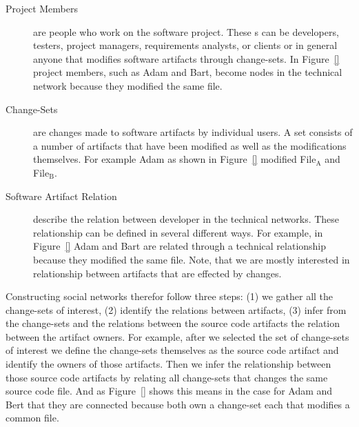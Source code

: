 \begin{description}
\item[Project Members] are people who work on the software project. 
These \people s can be developers, testers, project managers, requirements analysts,
or clients or in general anyone that modifies software artifacts through change-sets. 
In Figure~\ref{} project members, such as Adam and Bart, become nodes in the technical network because they modified the same file.

\item[Change-Sets] are changes made to software artifacts by individual users. 
A set consists of a number of artifacts that have been modified as well as the modifications themselves.
For example Adam as shown in Figure~\ref{} modified File$_{\text{A}}$ and File$_{\text{B}}$.

\item[Software Artifact Relation] describe the relation between developer in the technical networks.
These relationship can be defined in several different ways.
For example, in Figure~\ref{} Adam and Bart are related through a technical relationship because they modified the same file.
Note, that we are mostly interested in relationship between artifacts that are effected by changes.
\end{description}

Constructing social networks therefor follow three steps: (1) we gather all the change-sets of interest, (2) identify the relations between artifacts, (3) infer from the change-sets and the relations between the source code artifacts the relation between the artifact owners.
For example, after we selected the set of change-sets of interest we define the change-sets themselves as the source code artifact and identify the owners of those artifacts.
Then we infer the relationship between those source code artifacts by relating all change-sets that changes the same source code file.
And as Figure~\ref{} shows this means in the case for Adam and Bert that they are connected because both own a change-set each that modifies a common file.

